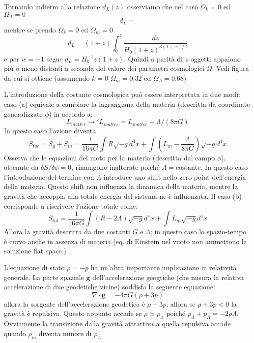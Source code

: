 Tornando indietro alla relazione $d_L(z)$ osserviamo che nel caso $\Omega_{k}=0$
ed $\Omega_{\Lambda}=0$
\begin{equation}
d_L =
\end{equation}
mentre se prendo $\Omega_{k}=0$ ed  $\Omega_{m}=0$
\begin{equation}
d_L = (1+z) \int_0^z \frac{dz}{H_0 (1+z)^{3(1+w)/2}}
\end{equation}
e per $w=-1$ segue $d_L=H_0^{-1} z (1+z)$. Quindi a parità di $z$ oggetti
appaiono più o meno distanti a seconda del valore dei parametri cosmologici
$\Omega$.  Vedi figura da cui si ottiene (assumendo $k=0$ $\Omega_{m}=0.32$ ed
$\Omega_{\Lambda}=0.68$)

L'introduzione della costante cosmologica pu\'o essere interpretata in due modi:
caso (a) equivale a cambiare la lagrangiana della materia (descritta da
coordinate generalizzate $\phi$) in accordo a:
\begin{equation}
  L_{matter} \to \prime L_{matter} = L_{matter} - \Lambda/(8 \pi G)
\end{equation}
In questo caso l'azione diventa
\begin{equation}
  S_{tot}=S_{g}+S_{m}= \frac {1}{16 \pi G}
  \int R \sqrt{-g} d^4x + \int \left( L_{m}- \frac {\Lambda}{8 \pi G} \right) \sqrt{-g} d^4 x
\end{equation}
Osserva che le equazioni del moto per la materia (descritta dal campo $\phi$),
ottenute da $\delta S/\delta \phi=0$, rimangono inalterate poiché
$\Lambda=\text{costante}$.  In questo caso l'introduzione del termine con
$\Lambda$ introduce uno shift nello zero point dell'energia della materia.
Questo shift non influenza la dinamica della materia, mentre la gravità che
accoppia alla totale energia del sistema ne è influenzata.  Il caso (b)
corrisponde a riscrivere l'azione totale come:
\begin{equation}
  S_{tot}= \frac {1}{16 \pi G}
  \int (R-2\Lambda)  \sqrt{-g} d^4x + \int  L_{m} \sqrt{-g} d^4 x
\end{equation}
Allora la gravità descritta da due costanti $G$ e $\Lambda$; in questo caso lo
spazio-tempo è curvo anche in assenza di materia (eq. di Einstein nel vuoto non
ammettono la soluzione flat space.)

L'equazione di stato $\rho=-p$ ha un'altra importante implicazione in relatività
generale.  La parte spaziale $\bm{g}$ dell'accelerazione geogtiche (che misura
la relativa accelerazione di due geodetiche vicine) soddisfa la seguente
equazione:
\begin{equation}
  \nabla \cdot \bm{g} = - 4 \pi G (\rho+3p)
\end{equation}
allora la sorgente dell'accelerazione geodetica è $\rho+3p$; allora se
$\rho+3p<0$ la gravità è repulsiva.  Questo appunto accade se
$\rho \simeq \rho_{\Lambda}$ poiché
$\rho_{\Lambda}+p_{\Lambda}= -2 \rho{\Lambda}$.  Ovviamente la transizione dalla
gravità attrattiva a quella repulsiva accade quando $\rho_m$ diventa minore di
$\rho_{\Lambda}$

